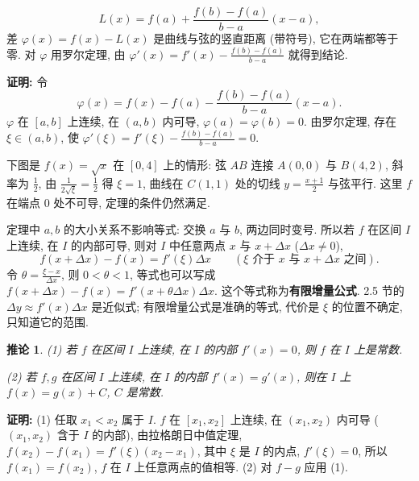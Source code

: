 \documentclass[UTF8,openany]{ctexbook}
\theoremstyle{chinesetextbook}
\newenvironment{cnproof}{\par\indent\textbf{证明:} \ignorespaces}{\par}
\newtheorem*{corollarysingle}{推论}
\begin{document}
\[
L(x)=f(a)+\frac{f(b)-f(a)}{b-a}(x-a),
\]
差 $\varphi(x)=f(x)-L(x)$ 是曲线与弦的竖直距离 (带符号), 它在两端都等于零. 对 $\varphi$ 用罗尔定理, 由 $\displaystyle\varphi'(x)=f'(x)-\frac{f(b)-f(a)}{b-a}$ 就得到结论.
\begin{cnproof}
令
\[
\varphi(x)=f(x)-f(a)-\frac{f(b)-f(a)}{b-a}(x-a).
\]
$\varphi$ 在 $[a,b]$ 上连续, 在 $(a,b)$ 内可导, $\varphi(a)=\varphi(b)=0$. 由罗尔定理, 存在 $\xi\in(a,b)$, 使 $\displaystyle\varphi'(\xi)=f'(\xi)-\frac{f(b)-f(a)}{b-a}=0$.
\end{cnproof}
下图是 $f(x)=\sqrt x$ 在 $[0,4]$ 上的情形: 弦 $AB$ 连接 $A(0,0)$ 与 $B(4,2)$, 斜率为 $\displaystyle\frac12$, 由 $\displaystyle\frac1{2\sqrt\xi}=\frac12$ 得 $\xi=1$, 曲线在 $C(1,1)$ 处的切线 $\displaystyle y=\frac{x+1}2$ 与弦平行. 这里 $f$ 在端点 $0$ 处不可导, 定理的条件仍然满足.
\begin{center}
\end{center}
定理中 $a,b$ 的大小关系不影响等式: 交换 $a$ 与 $b$, 两边同时变号. 所以若 $f$ 在区间 $I$ 上连续, 在 $I$ 的内部可导, 则对 $I$ 中任意两点 $x$ 与 $x+\Delta x$ ($\Delta x\ne0$),
\[
f(x+\Delta x)-f(x)=f'(\xi)\Delta x\qquad(\xi\text{ 介于 }x\text{ 与 }x+\Delta x\text{ 之间}).
\]
令 $\displaystyle\theta=\frac{\xi-x}{\Delta x}$, 则 $0<\theta<1$, 等式也可以写成 $f(x+\Delta x)-f(x)=f'(x+\theta\Delta x)\Delta x$. 这个等式称为\textbf{有限增量公式}. 2.5 节的 $\Delta y\approx f'(x)\Delta x$ 是近似式; 有限增量公式是准确的等式, 代价是 $\xi$ 的位置不确定, 只知道它的范围.
\begin{corollarysingle}
\textup{(1)} 若 $f$ 在区间 $I$ 上连续, 在 $I$ 的内部 $f'(x)=0$, 则 $f$ 在 $I$ 上是常数.

\textup{(2)} 若 $f,g$ 在区间 $I$ 上连续, 在 $I$ 的内部 $f'(x)=g'(x)$, 则在 $I$ 上 $f(x)=g(x)+C$, $C$ 是常数.
\end{corollarysingle}
\begin{cnproof}
(1) 任取 $x_1<x_2$ 属于 $I$. $f$ 在 $[x_1,x_2]$ 上连续, 在 $(x_1,x_2)$ 内可导 ($(x_1,x_2)$ 含于 $I$ 的内部), 由拉格朗日中值定理, $f(x_2)-f(x_1)=f'(\xi)(x_2-x_1)$, 其中 $\xi$ 是 $I$ 的内点, $f'(\xi)=0$, 所以 $f(x_1)=f(x_2)$, $f$ 在 $I$ 上任意两点的值相等. (2) 对 $f-g$ 应用 (1).
\end{cnproof}
\end{document}
